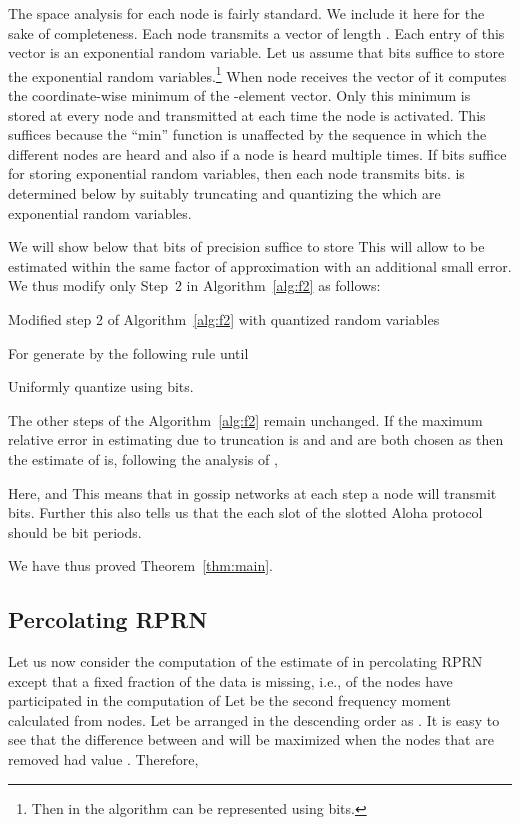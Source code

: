 \documentclass[10pt,twosided,a4paper,draft,onecolumn]{article}
\begin{document}
The space analysis for each node is fairly standard. We include it
here for the sake of completeness. Each node transmits a vector of
length . Each entry of this vector is an exponential random
variable. Let us assume that  bits suffice to store the exponential
random variables.\footnote{Then  in the algorithm can be
  represented using  bits.} When node  receives the vector of
 it computes the coordinate-wise minimum of the -element
vector. Only this minimum is stored at every node and transmitted at
each time the node is activated. This suffices because the ``min''
function is unaffected by the sequence in which the different nodes
are heard and also if a node is heard multiple times.  If  bits
suffice for storing exponential random variables, then each node
transmits  bits.  is determined below by suitably
truncating and quantizing the  which are exponential
random variables. 

We will show below that  bits of precision suffice to store
 This will allow  to be estimated within the same
factor of approximation with an additional small error. We thus modify
only Step~2 in Algorithm~\ref{alg:f2} as follows:

\begin{algorithm}
  \caption{Modified step 2 of Algorithm~\ref{alg:f2} with quantized
    random variables}{\label{alg:quant}} 
  \begin{algorithmic}[2a] 
    \STATE For  generate  by the
    following rule until  
    
  \item[] Uniformly quantize  using  bits.
  \end{algorithmic}
\end{algorithm}
The other steps of the Algorithm~\ref{alg:f2} remain unchanged.  If
the maximum relative error in estimating  due to truncation is
 and  and  are both chosen as  then the
estimate of  is, following the analysis of \cite{Ayaso08},

Here,  and  This means that in gossip networks at each step a node will transmit  bits. 
Further this also tells us that the each slot
of the slotted Aloha protocol should be  bit
periods.

We have thus proved Theorem~\ref{thm:main}. 

\subsection*{Percolating RPRN}

Let us now consider the computation of the estimate of  in
percolating RPRN except that a fixed fraction of the data is missing,
i.e.,  of the nodes have participated in the
computation of  Let  be the second frequency
moment calculated from  nodes.  Let  be arranged in
the descending order as .  It
is easy to see that the difference between  and 
will be maximized when the nodes that are removed had value
. Therefore,
\end{document}
